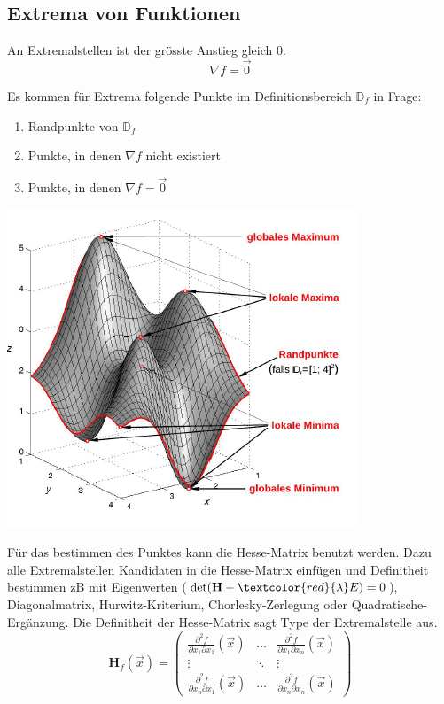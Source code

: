 \subsection{Extrema von Funktionen}
An Extremalstellen ist der grösste Anstieg gleich $0$.
\[\nabla f = \vec{0}\]

\noindent\begin{minipage}{\columnwidth}
	\begin{minipage}{0.7\textwidth}
		Es kommen für Extrema folgende Punkte im Definitionsbereich $\mathbb{D}_f$ in Frage:
		\begin{enumerate}[nosep]
			\item Randpunkte von $\mathbb{D}_f$
			\item Punkte, in denen $\nabla f$ nicht existiert
			\item Punkte, in denen $\nabla f = \vec{0}$
		\end{enumerate}
	\end{minipage}%
	\begin{minipage}{0.3\textwidth}
		\includegraphics[width=\columnwidth]{Images/extrema}
	\end{minipage}
\end{minipage}

Für das bestimmen des Punktes kann die Hesse-Matrix benutzt werden. Dazu alle Extremalstellen Kandidaten in die Hesse-Matrix einfügen und Definitheit bestimmen zB mit Eigenwerten ($\det(\mathbf{H} - \textcolor{red}{\lambda} E) = 0$), Diagonalmatrix, Hurwitz-Kriterium, Chorlesky-Zerlegung oder Quadratische-Ergänzung. Die Definitheit der Hesse-Matrix sagt Type der Extremalstelle aus.
\[
\mathbf{H}_f(\vec{x}) = \begin{pmatrix}
	\frac{\partial^2 f}{\partial x_1 \partial x_1}(\vec{x}) & \dots & \frac{\partial^2 f}{\partial x_1 \partial x_n}(\vec{x})\\
	\vdots & \ddots & \vdots \\
	\frac{\partial^2 f}{\partial x_n \partial x_1}(\vec{x}) & \dots & \frac{\partial^2 f}{\partial x_n \partial x_n}(\vec{x})
\end{pmatrix}
\]

